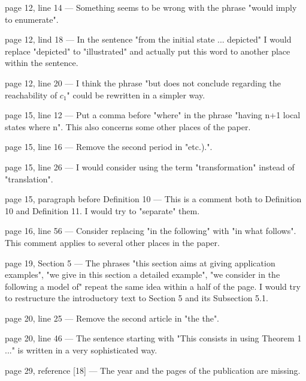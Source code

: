 \documentclass[11pt]{article}
\begin{document}
page 12, line 14 ---
Something seems to be wrong with the phrase "would imply to enumerate".

page 12, lind 18 ---
In the sentence "from the initial state ... depicted" I would replace "depicted" to "illustrated" and actually put this word to another place within the sentence.

page 12, line 20 ---
I think the phrase "but does not conclude regarding the reachability of $c_1$" could be rewritten in a simpler way.

page 15, line 12 ---
Put a comma before "where" in the phrase "having n+1 local states where n".
This also concerns some other places of the paper.

page 15, line 16 ---
Remove the second period in "etc.).".

page 15, line 26 ---
I would consider using the term "transformation" instead of "translation".

page 15, paragraph before Definition 10 ---
This is a comment both to Definition 10 and Definition 11. I would try to "separate" them.

page 16, line 56 ---
Consider replacing "in the following" with "in what follows".
This comment applies to several other places in the paper.

page 19, Section 5 ---
The phrases "this section aims at giving application examples", "we give in this section a detailed example", "we consider in the following a model of" repeat the same idea within a half of the page. I would try to restructure the introductory text to Section 5 and its Subsection 5.1.

page 20, line 25 ---
Remove the second article in "the the".

page 20, line 46 ---
The sentence starting with "This consists in using Theorem 1 ..." is written in a very sophisticated way.

page 29, reference [18] ---
The year and the pages of the publication are missing.


\end{document}
